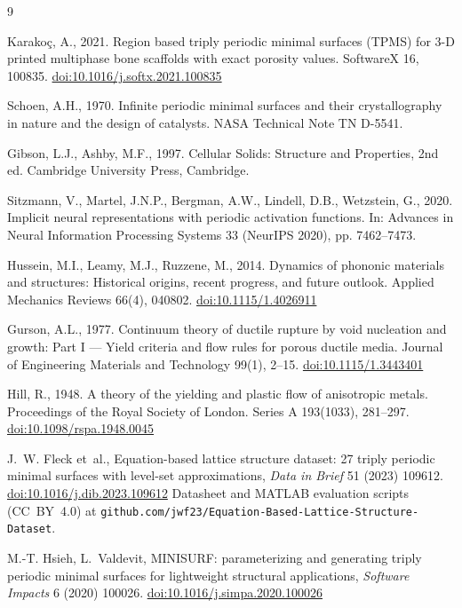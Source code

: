 \documentclass[5p,times,authoryear]{elsarticle}
\providecommand{\doi}[1]{\href{https://doi.org/#1}{doi:#1}} %
\begin{document}
\begin{thebibliography}{9}

Karako{\c{c}}, A., 2021. Region based triply periodic minimal surfaces (TPMS) for 3-D printed
multiphase bone scaffolds with exact porosity values. SoftwareX 16, 100835.
\doi{10.1016/j.softx.2021.100835}

Schoen, A.H., 1970. Infinite periodic minimal surfaces and their crystallography in nature and
the design of catalysts. NASA Technical Note TN D-5541.

Gibson, L.J., Ashby, M.F., 1997. Cellular Solids: Structure and Properties, 2nd ed. Cambridge
University Press, Cambridge.

Sitzmann, V., Martel, J.N.P., Bergman, A.W., Lindell, D.B., Wetzstein, G., 2020. Implicit neural
representations with periodic activation functions. In: Advances in Neural Information Processing
Systems 33 (NeurIPS 2020), pp. 7462--7473.

Hussein, M.I., Leamy, M.J., Ruzzene, M., 2014. Dynamics of phononic materials and structures:
Historical origins, recent progress, and future outlook. Applied Mechanics Reviews 66(4), 040802.
\doi{10.1115/1.4026911}

Gurson, A.L., 1977. Continuum theory of ductile rupture by void nucleation and growth: Part I ---
Yield criteria and flow rules for porous ductile media. Journal of Engineering Materials and
Technology 99(1), 2--15. \doi{10.1115/1.3443401}

Hill, R., 1948. A theory of the yielding and plastic flow of anisotropic metals. Proceedings of
the Royal Society of London. Series A 193(1033), 281--297. \doi{10.1098/rspa.1948.0045}

J.~W. Fleck et~al., Equation-based lattice structure dataset: 27 triply periodic minimal
surfaces with level-set approximations, \textit{Data in Brief} 51 (2023) 109612.
\doi{10.1016/j.dib.2023.109612} Datasheet and MATLAB evaluation scripts (CC~BY~4.0) at
\texttt{github.com/jwf23/Equation-Based-Lattice-Structure-Dataset}.

M.-T. Hsieh, L.~Valdevit, MINISURF: parameterizing and generating triply periodic minimal
surfaces for lightweight structural applications, \textit{Software Impacts} 6 (2020) 100026.
\doi{10.1016/j.simpa.2020.100026}

\end{thebibliography}
\end{document}
